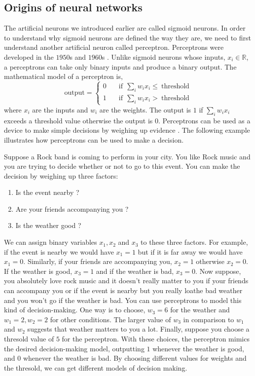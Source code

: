 \subsection{Origins of neural networks}
The artificial neurons we introduced earlier are called sigmoid neurons. In order to understand 
why sigmoid neurons are defined the way they are, we need to first understand another artificial 
neuron called perceptron. Perceptrons were developed in the $1950$s and $1960$s \cite{rosenblatt1958perceptron}. Unlike sigmoid neurons 
whose inputs, $x_i \in \mathbb{R}$, a perceptrons can take only binary inputs and produce a binary output.
The mathematical model of a perceptron is,
\begin{equation*}
    \text{output} = 
     \begin{cases}
       0 &\quad \text{if} \ \ \sum_i w_i x_i \leq \ \text{threshold} \\
       1 &\quad  \text{if} \ \ \sum_i w_i x_i > \ \text{threshold} 
     \end{cases}
\end{equation*}
where $x_i$ are the inputs and $w_i$ are the weights. The output is $1$ if $\sum_i w_i x_i$ exceeds a threshold 
value otherwise the output is $0$. Perceptrons can be used as a device to make simple decisions by weighing up evidence \cite{nielsen2015neural}. 
The following example illustrates how perceptrons can be used to make a decision.
\begin{boxedexample}
    Suppose a Rock band is coming to perform in your city. You like Rock music and you are trying to 
    decide whether or not to go to this event. You can make the decision by weighing up three factors:
   \begin{enumerate}
    \item Is the event nearby ?
    \item Are your friends accompanying you ?
    \item Is the weather good ?
   \end{enumerate}
   We can assign binary variables $x_1, x_2$ and $x_3$ to these three factors. For example, if the event is nearby we would
   have $x_1 =1$ but if it is far away we would have $x_1 = 0$. Similarly, if your friends are accompanying you, $x_2 =1$ otherwise $x_2 =0$.
   If the weather is good, $x_3 =1$ and if the weather is bad, $x_3 =0$. Now suppose, you absolutely love rock music and it doesn't really 
   matter to you if your friends can accompany you or if the event is nearby but you really loathe bad weather and you won't go if the
   weather is bad. You can use perceptrons to model this kind of decision-making. One way is to choose, $w_3 = 6$ for the weather and
   $w_1 =2, w_2 =2$ for other conditions. The larger value of $w_3$ in comparison to $w_1$ and $w_2$ suggests that weather matters to you a lot. 
   Finally, suppose you choose a thresold value of $5$ for the perceptron. With these choices, the perceptron mimics the desired 
   decision-making model, outputting $1$ whenever the weather is good, and $0$ whenever the weather is bad. By choosing different values for 
   weights and the thresold, we can get different models of decision making. 
\end{boxedexample}
